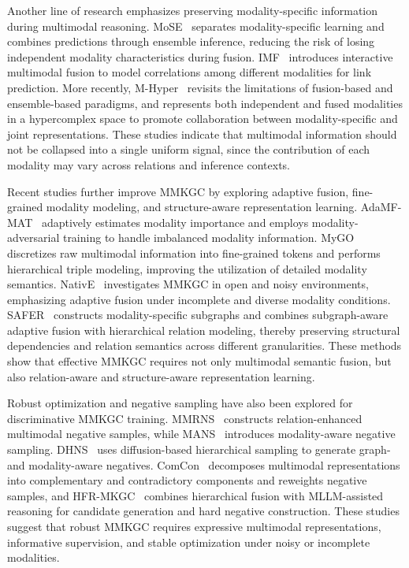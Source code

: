 \documentclass[pdflatex,sn-mathphys-num]{sn-jnl}
\begin{document}
Another line of research emphasizes preserving modality-specific information during multimodal reasoning. MoSE~\cite{zhao2022mose} separates modality-specific learning and combines predictions through ensemble inference, reducing the risk of losing independent modality characteristics during fusion. IMF~\cite{li2023imf} introduces interactive multimodal fusion to model correlations among different modalities for link prediction. More recently, M-Hyper~\cite{liu2026mhyper} revisits the limitations of fusion-based and ensemble-based paradigms, and represents both independent and fused modalities in a hypercomplex space to promote collaboration between modality-specific and joint representations. These studies indicate that multimodal information should not be collapsed into a single uniform signal, since the contribution of each modality may vary across relations and inference contexts.

Recent studies further improve MMKGC by exploring adaptive fusion, fine-grained modality modeling, and structure-aware representation learning. AdaMF-MAT~\cite{zhang2024adamfmat} adaptively estimates modality importance and employs modality-adversarial training to handle imbalanced modality information. MyGO~\cite{zhang2025mygo} discretizes raw multimodal information into fine-grained tokens and performs hierarchical triple modeling, improving the utilization of detailed modality semantics. NativE~\cite{zhang2024native} investigates MMKGC in open and noisy environments, emphasizing adaptive fusion under incomplete and diverse modality conditions. SAFER~\cite{li2026safer} constructs modality-specific subgraphs and combines subgraph-aware adaptive fusion with hierarchical relation modeling, thereby preserving structural dependencies and relation semantics across different granularities. These methods show that effective MMKGC requires not only multimodal semantic fusion, but also relation-aware and structure-aware representation learning.

Robust optimization and negative sampling have also been explored for discriminative MMKGC training. MMRNS~\cite{xu2022rens} constructs relation-enhanced multimodal negative samples, while MANS~\cite{zhang2023mans} introduces modality-aware negative sampling. DHNS~\cite{niu2025dhns} uses diffusion-based hierarchical sampling to generate graph- and modality-aware negatives. ComCon~\cite{chen2026comcon} decomposes multimodal representations into complementary and contradictory components and reweights negative samples, and HFR-MKGC~\cite{wang2026hfr} combines hierarchical fusion with MLLM-assisted reasoning for candidate generation and hard negative construction. These studies suggest that robust MMKGC requires expressive multimodal representations, informative supervision, and stable optimization under noisy or incomplete modalities.
\end{document}
